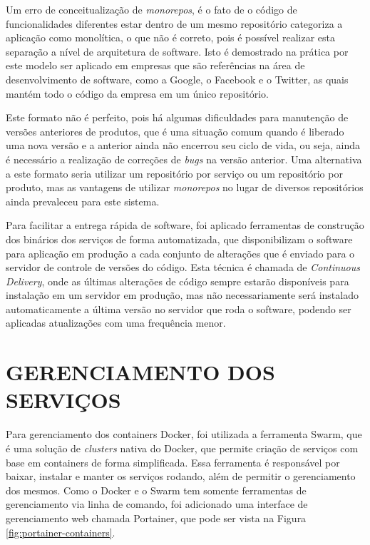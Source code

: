 Um erro de conceitualização de \emph{monorepos}, é o fato de o código de
funcionalidades diferentes estar dentro de um mesmo repositório categoriza
a aplicação como monolítica, o que não é correto, pois é possível
realizar esta separação a nível de arquitetura de software. Isto é demostrado
na prática por este modelo ser aplicado em empresas que são referências
na área de desenvolvimento de software, como a Google, o Facebook e o Twitter,
as quais mantém todo o código da empresa em um único repositório.

Este formato não é perfeito, pois há algumas dificuldades para manutenção
de versões anteriores de produtos, que é uma situação comum quando é
liberado uma nova versão e a anterior ainda não encerrou seu ciclo de vida,
ou seja, ainda é necessário a realização de correções de \emph{bugs}
na versão anterior. Uma alternativa a este formato seria utilizar um
repositório por serviço ou um repositório por produto, mas as vantagens
de utilizar \emph{monorepos} no lugar de diversos repositórios ainda
prevaleceu para este sistema.

Para facilitar a entrega rápida de software, foi aplicado ferramentas de
construção dos binários dos serviços de forma automatizada, que disponibilizam
o software para aplicação em produção a cada conjunto de alterações que é
enviado para o servidor de controle de versões do código. Esta técnica é
chamada de \emph{Continuous Delivery}, onde as últimas alterações de código
sempre estarão disponíveis para instalação em um servidor em produção, mas
não necessariamente será instalado automaticamente a última versão no
servidor que roda o software, podendo ser aplicadas atualizações com uma
frequência menor.

\section{GERENCIAMENTO DOS SERVIÇOS}

Para gerenciamento dos containers Docker, foi utilizada a ferramenta Swarm,
que é uma solução de \emph{clusters} nativa do Docker, que permite criação de
serviços com base em containers de forma simplificada. Essa ferramenta é
responsável por baixar, instalar e manter os serviços rodando, além de
permitir o gerenciamento dos mesmos. Como o Docker e o Swarm tem somente
ferramentas de gerenciamento via linha de comando, foi adicionado uma
interface de gerenciamento web chamada Portainer, que pode ser vista na Figura
\ref{fig:portainer-containers}.

